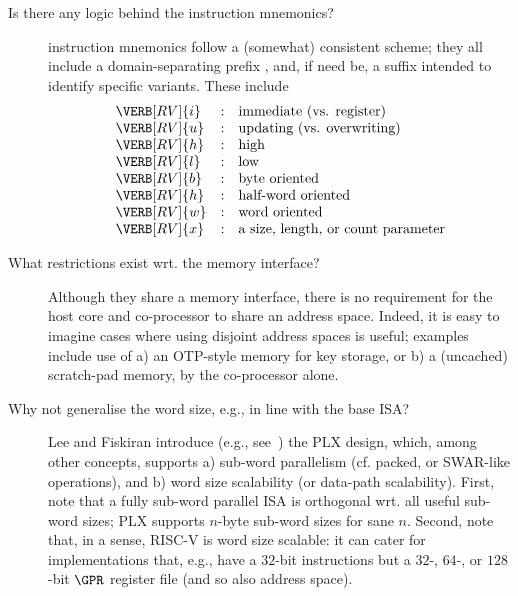 
%
%
%
%


\begin{description}

\item[Is there any logic behind the \XCID instruction mnemonics?]
      \XCID instruction mnemonics follow a (somewhat) consistent scheme; 
      they all include a domain-separating prefix , and, if
      need be, a suffix intended to identify specific variants.  These 
      include
      \[
      \begin{array}{lcl}
      \VERB[RV]{i} &:& \mbox{immediate (vs. register)   }        \\
      \VERB[RV]{u} &:& \mbox{updating  (vs. overwriting)}        \\
      \VERB[RV]{h} &:& \mbox{high}                               \\
      \VERB[RV]{l} &:& \mbox {low}                               \\
      \VERB[RV]{b} &:& \mbox     {byte oriented}                 \\
      \VERB[RV]{h} &:& \mbox{half-word oriented}                 \\
      \VERB[RV]{w} &:& \mbox     {word oriented}                 \\
      \VERB[RV]{x} &:& \mbox{a size, length, or count parameter} \\
      \end{array}
      \]

\item[What restrictions exist wrt. the \XCID memory interface?]
      Although they share a memory interface, there is no requirement for
      the host core and co-processor to share an address space.  Indeed,
      it is easy to imagine cases where using disjoint address spaces is
      useful; examples include use of
      a) an OTP-style memory for key storage, 
         or
      b) a (uncached) scratch-pad memory,
      by the co-processor alone.

\item[Why not generalise the \XCID word size, e.g., in line with the base ISA?]
      Lee and Fiskiran introduce (e.g., see~\cite{SCARV:LeeFis:05}) the PLX
      design, which, among other concepts, supports 
      a) sub-word parallelism (cf. packed, or SWAR-like operations),
         and
      b) word size scalability (or data-path scalability).
      First, 
      note that a fully sub-word parallel ISA is orthogonal wrt. all useful
      sub-word sizes; PLX supports $n$-byte sub-word sizes for sane $n$.
      Second,
      note that, in a sense, RISC-V is word size scalable: it can cater for
      implementations that, e.g., have a $32$-bit instructions but a $32$-,
      $64$-, or $128$-bit $\GPR$ register file (and so also address space). 


\end{description}
